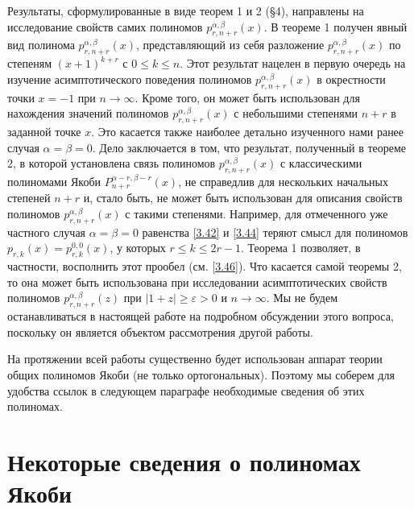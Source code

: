 Результаты, сформулированные в виде теорем 1 и 2 (\S 4), направлены на исследование свойств самих полиномов $p^{\alpha,\beta}_{r,n+r}(x)$.   В теореме 1 получен явный вид полинома $p^{\alpha,\beta}_{r,n+r}(x)$, представляющий из себя разложение $p^{\alpha,\beta}_{r,n+r}(x)$ по степеням $(x+1)^{k+r}$ с $0\le k\le n$. Этот результат нацелен в первую очередь на изучение асимптотического поведения полиномов  $p^{\alpha,\beta}_{r,n+r}(x)$  в окрестности точки $x=-1$ при $n\to\infty$. Кроме того, он может быть использован для нахождения значений полиномов $p^{\alpha,\beta}_{r,n+r}(x)$ с небольшими степенями $n+r$ в заданной точке $x$. Это касается также наиболее детально изученного нами ранее случая $\alpha=\beta=0$.  Дело заключается в том, что результат, полученный в теореме 2, в которой установлена связь полиномов $p^{\alpha,\beta}_{r,n+r}(x)$ с классическими полиномами Якоби $P_{n+r}^{\alpha-r,\beta-r}(x)$, не справедлив для нескольких начальных степеней $n+r$ и, стало быть, не может быть использован для описания свойств полиномов $p^{\alpha,\beta}_{r,n+r}(x)$ с такими степенями. Например, для отмеченного уже частного случая $\alpha=\beta=0$ равенства \eqref{3.42} и \eqref{3.44} теряют смысл для полиномов $p_{r,k}(x)=p^{0,0}_{r,k}(x)$, у которых $r\le k\le 2r-1$. Теорема 1 позволяет, в частности, восполнить этот прообел (см. \eqref{3.46}). Что касается самой теоремы 2, то она может быть использована при исследовании асимптотических свойств полиномов $p^{\alpha,\beta}_{r,n+r}(z)$ при $|1+z|\ge\varepsilon>0$ и $n\to\infty$. Мы не будем останавливаться в настоящей работе на подробном обсуждении этого вопроса, поскольку он является объектом рассмотрения другой работы.

 На протяжении всей работы существенно будет использован аппарат теории общих полиномов Якоби (не только ортогональных). Поэтому мы соберем для удобства ссылок в следующем параграфе необходимые сведения об этих полиномах.

 \section{Некоторые сведения о полиномах Якоби}


